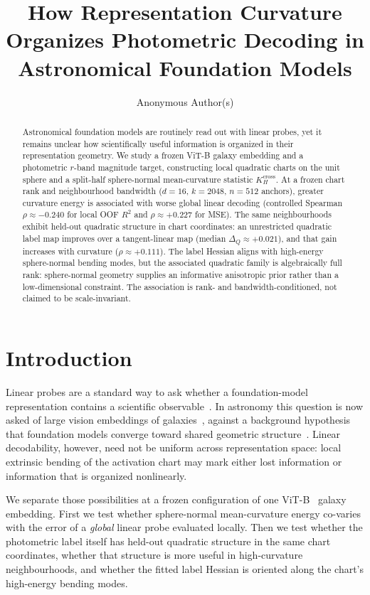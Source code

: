 \documentclass{article}
\title{How Representation Curvature Organizes Photometric Decoding in Astronomical Foundation Models}
\author{
  Anonymous Author(s)
}
\begin{document}
\maketitle

\begin{abstract}
Astronomical foundation models are routinely read out with linear probes, yet it remains unclear how scientifically useful information is organized in their representation geometry.
We study a frozen ViT-B galaxy embedding and a photometric $r$-band magnitude target, constructing local quadratic charts on the unit sphere and a split-half sphere-normal mean-curvature statistic $K_H^{\mathrm{cross}}$.
At a frozen chart rank and neighbourhood bandwidth ($d{=}16$, $k{=}2048$, $n{=}512$ anchors), greater curvature energy is associated with worse global linear decoding (controlled Spearman $\rho{\approx}-0.240$ for local OOF $R^2$ and $\rho{\approx}{+}0.227$ for MSE).
The same neighbourhoods exhibit held-out quadratic structure in chart coordinates: an unrestricted quadratic label map improves over a tangent-linear map (median $\Delta_Q{\approx}{+}0.021$), and that gain increases with curvature ($\rho{\approx}{+}0.111$).
The label Hessian aligns with high-energy sphere-normal bending modes, but the associated quadratic family is algebraically full rank: sphere-normal geometry supplies an informative anisotropic prior rather than a low-dimensional constraint.
The association is rank- and bandwidth-conditioned, not claimed to be scale-invariant.
\end{abstract}

\section{Introduction}
\label{sec:intro}

Linear probes are a standard way to ask whether a foundation-model representation contains a scientific observable~\citep{alain2017probes}.
In astronomy this question is now asked of large vision embeddings of galaxies~\citep{duraphe2025platonicuniverse}, against a background hypothesis that foundation models converge toward shared geometric structure~\citep{huh2024platonic}.
Linear decodability, however, need not be uniform across representation space: local extrinsic bending of the activation chart may mark either lost information or information that is organized nonlinearly.

We separate those possibilities at a frozen configuration of one ViT-B~\citep{dosovitskiy2021vit} galaxy embedding.
First we test whether sphere-normal mean-curvature energy co-varies with the error of a \emph{global} linear probe evaluated locally.
Then we test whether the photometric label itself has held-out quadratic structure in the same chart coordinates, whether that structure is more useful in high-curvature neighbourhoods, and whether the fitted label Hessian is oriented along the chart's high-energy bending modes.
\end{document}
